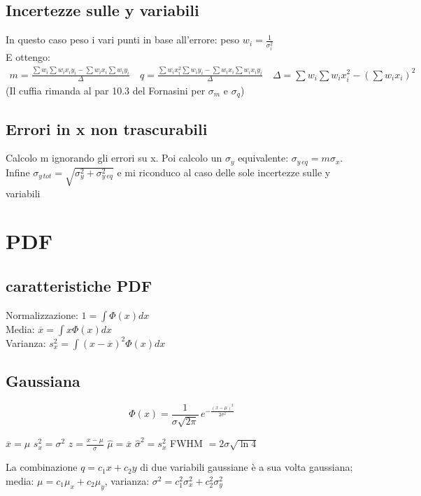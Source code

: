 \documentclass[11pt]{article}
\begin{document}
    \subsection{Incertezze sulle y variabili}
    In questo caso peso i vari punti in base all'errore: peso $w_i = \frac{1}{\sigma_i^2}$ \\
    E ottengo:
    \begin{gather*}
        m = \frac{\sum w_i \sum w_i x_i y_i - \sum w_i x_i \sum w_i y_i}{\Delta}\quad
        q = \frac{\sum w_i x_i^2 \sum w_i y_i  - \sum w_i x_i \sum w_i x_i y_i}{\Delta} \quad
        \Delta = \sum w_i \sum w_i x_i^2 - \left( \sum w_i x_i \right)^2
    \end{gather*}
    (Il cuffia rimanda al par 10.3 del Fornasini per $\sigma_m$ e $\sigma_q$)

    \subsection{Errori in x non trascurabili}
    Calcolo m ignorando gli errori su x. Poi calcolo un $\sigma_y$ equivalente: $\sigma_{y \, eq} = m \sigma_x$. \\
    Infine $ \sigma_{y \, tot} = \sqrt{\sigma_y^2 + \sigma_{y \, eq}^2} $ e mi riconduco al caso delle sole incertezze
    sulle y variabili

    \section{PDF}

    \subsection{caratteristiche PDF}
    Normalizzazione: $ 1 = \int \Phi(x) dx $ \\[.3\baselineskip]
    Media: $\overline{x} = \int x \Phi(x) dx $ \\[.3\baselineskip]
    Varianza: $ s_x^2 = \int (x - \overline{x})^2 \Phi(x) dx $

    \subsection{Gaussiana}
    \[ \Phi (x) = \frac{1}{\sigma \sqrt{2 \pi}} \, e^{- \frac{(x - \mu)^2}{2 \sigma^2}} \] \hfill
    \begin{center}
        \begin{minipage}{.75\textwidth}
            $\overline{x} = \mu $ \hfill $ s_x^2 = \sigma^2 $ \hfill $ z = \frac{x - \mu}{\sigma} $ \hfill
            $ \hat{\mu} = \overline{x} $ \hfill $\hat{\sigma}^2 = s_x^2 $ \hfill FWHM $ = 2 \sigma \sqrt{\ln 4} $ \hfill
        \end{minipage}
    \end{center}
    La combinazione $ q = c_1 x + c_2 y $ di due variabili gaussiane è a sua volta gaussiana; \\
    media: $ \mu = c_1 \mu_x + c_2 \mu_y $, varianza: $ \sigma^2 = c_1^2 \sigma_x^2 + c_2^2 \sigma_y^2 $
\end{document}
